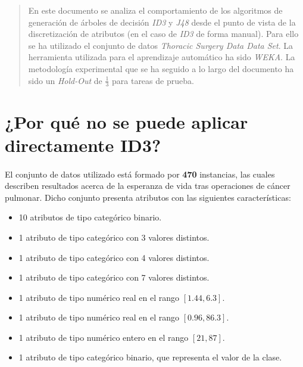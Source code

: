 \documentclass[10pt, a4paper,spanish]{article}
\begin{document}
	\maketitle %

	\thispagestyle{fancy} %



	\begin{abstract}
		\noindent En este documento se analiza el comportamiento de los algoritmos de generación de árboles de decisión \emph{ID3} y \emph{J48} desde el punto de vista de la discretización de atributos (en el caso de \emph{ID3} de forma manual). Para ello se ha utilizado el conjunto de datos \emph{Thoracic Surgery Data Data Set}\cite{dataset:thoracic}. La herramienta utilizada para el aprendizaje automático ha sido \emph{WEKA}\cite{tool:weka}. La metodología experimental que se ha seguido a lo largo del documento ha sido un \emph{Hold-Out} de $\frac{1}{3}$ para tareas de prueba.
	\end{abstract}



	\section{¿Por qué no se puede aplicar directamente ID3?}

		\paragraph{}
		El conjunto de datos utilizado\cite{dataset:thoracic} está formado por \textbf{470} instancias, las cuales describen resultados acerca de la esperanza de vida tras operaciones de cáncer pulmonar. Dicho conjunto presenta atributos con las siguientes características:
		\begin{itemize}
			\setlength\itemsep{0em}
			\item 10 atributos de tipo categórico binario.
			\item 1 atributo de tipo categórico con 3 valores distintos.
			\item 1 atributo de tipo categórico con 4 valores distintos.
			\item 1 atributo de tipo categórico con 7 valores distintos.
			\item 1 atributo de tipo numérico real en el rango $[1.44, 6.3]$.
			\item 1 atributo de tipo numérico real en el rango $[0.96, 86.3]$.
			\item 1 atributo de tipo numérico entero en el rango $[21, 87]$.
			\item 1 atributo de tipo categórico binario, que representa el valor de la clase.
		\end{itemize}
\end{document}
